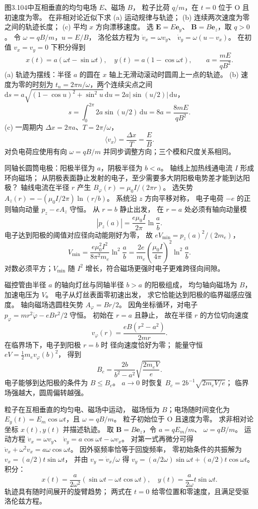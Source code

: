 图3.104中互相垂直的均匀电场 $E$、磁场 $B$，
粒子比荷 $q/m$，在 $t=0$ 位于 O 且初速度为零。
在非相对论近似下求
(a) 运动规律与轨迹；
(b) 连续两次速度为零之间的轨迹长度；
(c) 平均 $x$ 方向漂移速度。
\exsolution
选 $\bm E=E\bm e_y$、
$\bm B=B\bm e_z$，取 $q>0$。
令 $\omega=qB/m$，$u=E/B$，
洛伦兹方程为
$\dot v_x=\omega v_y$、
$\dot v_y=\omega(u-v_x)$。
在初值 $v_x=v_y=0$ 下积分得到
\[
\boxed{x(t)=a(\omega t-\sin\omega t),\quad
y(t)=a(1-\cos\omega t),\qquad
a=\frac{mE}{qB^2}}.
\]
(a) 轨迹为摆线：半径 $a$ 的圆在 $x$ 轴上无滑动滚动时圆周上一点的轨迹。
(b) 速度为零的时刻为
$t_n=2\pi n/\omega$，两个连续尖点之间
$\mathrm ds=a\sqrt{(1-\cos u)^2+\sin^2u}\,\mathrm du
=2a|\sin(u/2)|\,\mathrm du$，
\[
\boxed{s=\int_0^{2\pi}2a\sin(u/2)\,\mathrm du=8a
=\frac{8mE}{qB^2}}.
\]
(c) 一周期内
$\Delta x=2\pi a$、$T=2\pi/\omega$，
\[
\boxed{\langle v_x\rangle=\frac{\Delta x}{T}=\frac EB}.
\]
\excheck 对负电荷应使用有向 $\omega=qB/m$ 并同步调整方向；三个模和尺度关系相同。

同轴长圆筒电极：阳极半径为 $a$，阴极半径为 $b<a$。
轴线上加热线通电流 $I$ 形成环向磁场；
从阴极表面静止发射的电子，至少需要多大阴阳极电势差才能到达阳极？
\exsolution
轴线电流在半径 $r$ 产生
$B_\varphi(r)=\mu_0I/(2\pi r)$。
选矢势
$A_z(r)=-(\mu_0I/2\pi)\ln(r/b)$。
系统沿 $z$ 方向平移对称，
电子电荷 $-e$ 的正则轴向动量
$p_z-eA_z$ 守恒。
从 $r=b$ 静止出发，
在 $r=a$ 处必须有轴向动量模
\[
|p_z(a)|=\frac{e\mu_0I}{2\pi}\ln\frac ab.
\]
电子达到阳极的阈值对应径向动能刚好为零，
故 $eV_{\min}=p_z(a)^2/(2m_e)$，
\[
\boxed{V_{\min}=
\frac{e\mu_0^2I^2}{8\pi^2m_e}
\ln^2\frac ab
=\frac{2e}{m_e}\left(\frac{\mu_0I}{4\pi}\right)^2
\ln^2\frac ab}.
\]
\excheck 对数必须平方；$V_{\min}$ 随 $I^2$ 增长，符合磁场更强时电子更难跨径向间隙。

磁控管由半径 $a$ 的轴向灯丝与同轴半径 $b>a$ 的阳极组成，
均匀轴向磁场为 $B$，加速电压为 $V$。
电子从灯丝表面零初速出发，
求它恰能达到阳极的临界磁感应强度。
\exsolution
轴向磁场选圆柱矢势
$A_\varphi=Br/2$。
因角坐标循环，对电子
$p_\varphi=mr^2\dot\varphi-eBr^2/2$ 守恒。
初始在 $r=a$ 且静止，
故在半径 $r$ 的方位切向速度
\[
v_\varphi(r)=\frac{eB(r^2-a^2)}{2mr}.
\]
在临界场下，电子到阳极 $r=b$ 时
径向速度恰好为零；
能量守恒 $eV=\tfrac12m_ev_\varphi(b)^2$，
得到
\[
\boxed{B_c=\frac{2b}{b^2-a^2}
\sqrt{\frac{2m_eV}{e}}}.
\]
电子能够到达阳极的条件为 $B\le B_c$。
\excheck $a\to0$ 时恢复
$B_c=2b^{-1}\sqrt{2m_eV/e}$；
临界场强越大，圆周偏转越强。

粒子在互相垂直的均匀电、磁场中运动，
磁场恒为 $B$；电场随时间变化为
$E_y(t)=E_m\cos\omega t$，且
$\omega=qB/m$。
粒子初始位于 O 且速度为零。
求非相对论坐标 $x(t),y(t)$ 并描述轨迹。
\exsolution
取 $\bm B=B\bm e_z$，令
$a=qE_m/m$、
$\omega=qB/m$。
运动方程
$\dot v_x=\omega v_y$、
$\dot v_y=a\cos\omega t-\omega v_x$。
对第一式再微分可得
$\ddot v_x+\omega^2v_x=a\omega\cos\omega t$。
因外驱频率恰等于回旋频率，
零初始条件的共振解为
$v_x=(a/2)t\sin\omega t$，
并由 $v_y=\dot v_x/\omega$ 得
$v_y=(a/2\omega)\sin\omega t+
(a/2)t\cos\omega t$。
积分：
\[
\boxed{x(t)=\frac{a}{2\omega^2}
(\sin\omega t-\omega t\cos\omega t)},
\quad
\boxed{y(t)=\frac{a}{2\omega}t\sin\omega t}.
\]
\excheck 轨迹具有随时间展开的旋臂趋势；
两式在 $t=0$ 给零位置和零速度，且满足受驱洛伦兹方程。


